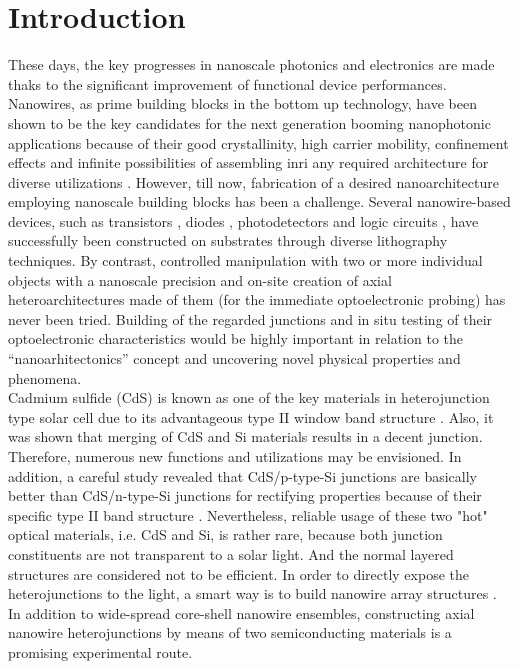 \section{Introduction}
These days, the key progresses in nanoscale photonics and electronics are made thaks to the significant improvement of functional device performances. Nanowires, as prime building blocks in the bottom up technology, have been shown to be the key candidates for the next generation booming nanophotonic applications because of their good crystallinity, high carrier mobility, confinement effects and infinite possibilities of assembling inri any required architecture for diverse utilizations \cite{lieberprogramable2014,tsai2014,zhangx2014}. However, till now, fabrication of a desired nanoarchitecture employing nanoscale building blocks has been a challenge. Several nanowire-based devices, such as transistors \cite{577926446,577926447,577926448}, diodes \cite{577926449}, photodetectors \cite{577926451,tian2014photodetectors} and logic circuits \cite{577926453,577926454}, have successfully been constructed on substrates through diverse lithography techniques. By contrast, controlled manipulation with two or more individual objects with a nanoscale precision and on-site creation of axial heteroarchitectures made of them (for the immediate optoelectronic probing) has never been tried. Building of the regarded junctions and in situ testing of their optoelectronic characteristics would be highly important in relation to the “nanoarhitectonics” concept and uncovering novel physical properties and phenomena.\\ 

Cadmium sulfide (CdS) is known as one of the key materials in heterojunction type solar cell due to its advantageous type II window band structure  \cite{577926455}. Also, it was shown that merging of CdS and Si materials results in a decent junction. Therefore, numerous new functions and  utilizations may be envisioned. In addition, a careful study revealed that CdS/p-type-Si junctions are basically better than CdS/n-type-Si junctions for rectifying properties because of their specific type II band structure \cite{577926457}. Nevertheless, reliable usage of these two "hot" optical materials, i.e. CdS and Si, is rather rare, because both junction constituents are not transparent to a solar light. And the normal layered structures are considered not to be efficient. In order to directly expose the heterojunctions to the light, a smart way is to build nanowire array structures \cite{577926458,577926459}. In addition to wide-spread core-shell nanowire ensembles, constructing axial nanowire heterojunctions by means of two semiconducting materials is a promising experimental route.\\

